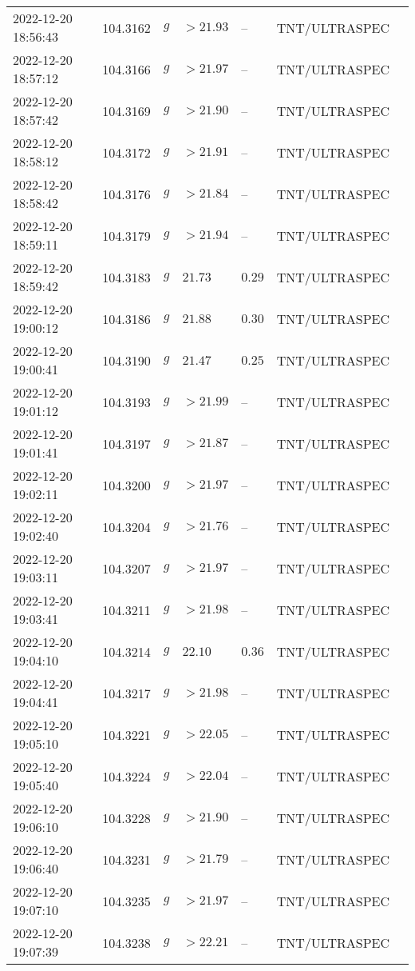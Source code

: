 \documentclass{nature_plusfigure}
\begin{document}
\begin{supplement}
\begin{center}
\begin{longtable}{lllllll}
2022-12-20 18:56:43 & 104.3162 & $g$ & $>21.93$ & -- & TNT/ULTRASPEC &  \\ 
2022-12-20 18:57:12 & 104.3166 & $g$ & $>21.97$ & -- & TNT/ULTRASPEC &  \\ 
2022-12-20 18:57:42 & 104.3169 & $g$ & $>21.90$ & -- & TNT/ULTRASPEC &  \\ 
2022-12-20 18:58:12 & 104.3172 & $g$ & $>21.91$ & -- & TNT/ULTRASPEC &  \\ 
2022-12-20 18:58:42 & 104.3176 & $g$ & $>21.84$ & -- & TNT/ULTRASPEC &  \\ 
2022-12-20 18:59:11 & 104.3179 & $g$ & $>21.94$ & -- & TNT/ULTRASPEC &  \\ 
2022-12-20 18:59:42 & 104.3183 & $g$ & $21.73$ & $0.29$ & TNT/ULTRASPEC &  \\ 
2022-12-20 19:00:12 & 104.3186 & $g$ & $21.88$ & $0.30$ & TNT/ULTRASPEC &  \\ 
2022-12-20 19:00:41 & 104.3190 & $g$ & $21.47$ & $0.25$ & TNT/ULTRASPEC &  \\ 
2022-12-20 19:01:12 & 104.3193 & $g$ & $>21.99$ & -- & TNT/ULTRASPEC &  \\ 
2022-12-20 19:01:41 & 104.3197 & $g$ & $>21.87$ & -- & TNT/ULTRASPEC &  \\ 
2022-12-20 19:02:11 & 104.3200 & $g$ & $>21.97$ & -- & TNT/ULTRASPEC &  \\ 
2022-12-20 19:02:40 & 104.3204 & $g$ & $>21.76$ & -- & TNT/ULTRASPEC &  \\ 
2022-12-20 19:03:11 & 104.3207 & $g$ & $>21.97$ & -- & TNT/ULTRASPEC &  \\ 
2022-12-20 19:03:41 & 104.3211 & $g$ & $>21.98$ & -- & TNT/ULTRASPEC &  \\ 
2022-12-20 19:04:10 & 104.3214 & $g$ & $22.10$ & $0.36$ & TNT/ULTRASPEC &  \\ 
2022-12-20 19:04:41 & 104.3217 & $g$ & $>21.98$ & -- & TNT/ULTRASPEC &  \\ 
2022-12-20 19:05:10 & 104.3221 & $g$ & $>22.05$ & -- & TNT/ULTRASPEC &  \\ 
2022-12-20 19:05:40 & 104.3224 & $g$ & $>22.04$ & -- & TNT/ULTRASPEC &  \\ 
2022-12-20 19:06:10 & 104.3228 & $g$ & $>21.90$ & -- & TNT/ULTRASPEC &  \\ 
2022-12-20 19:06:40 & 104.3231 & $g$ & $>21.79$ & -- & TNT/ULTRASPEC &  \\ 
2022-12-20 19:07:10 & 104.3235 & $g$ & $>21.97$ & -- & TNT/ULTRASPEC &  \\ 
2022-12-20 19:07:39 & 104.3238 & $g$ & $>22.21$ & -- & TNT/ULTRASPEC &  \\ 

\end{longtable}
\end{center}
\end{supplement}
\end{document}
